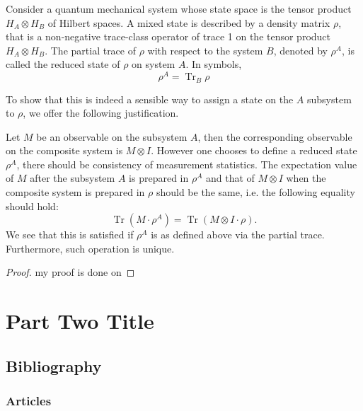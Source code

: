 \documentclass[
	11pt, %
	fleqn, %
	a4paper, %
]{LegrandOrangeBook}
\begin{document}
Consider a quantum mechanical system whose state space is the tensor product $H_A \otimes H_B$ of Hilbert spaces. A mixed state is described by a density matrix $\rho$, that is a non-negative trace-class operator of trace 1 on the tensor product $H_A \otimes H_B$. The partial trace of $\rho$ with respect to the system $B$, denoted by $\rho^A$, is called the reduced state of $\rho$ on system $A$. In symbols,
$$
\rho^A=\operatorname{Tr}_B \rho
$$

To show that this is indeed a sensible way to assign a state on the $A$ subsystem to $\rho$, we offer the following justification. 

Let $M$ be an observable on the subsystem $A$, then the corresponding observable on the composite system is $M \otimes I$. However one chooses to define a reduced state $\rho^A$, there should be consistency of measurement statistics. The expectation value of $M$ after the subsystem $A$ is prepared in $\rho^A$ and that of $M \otimes I$ when the composite system is prepared in $\rho$ should be the same, i.e. the following equality should hold:
$$
\operatorname{Tr}\left(M \cdot \rho^A\right)=\operatorname{Tr}(M \otimes I \cdot \rho) .
$$
We see that this is satisfied if $\rho^A$ is as defined above via the partial trace. Furthermore, such operation is unique.

\begin{proof}
    my proof is done on
\end{proof}

\part{Part Two Title}



\chapter*{Bibliography}

\section{Articles}
\end{document}
